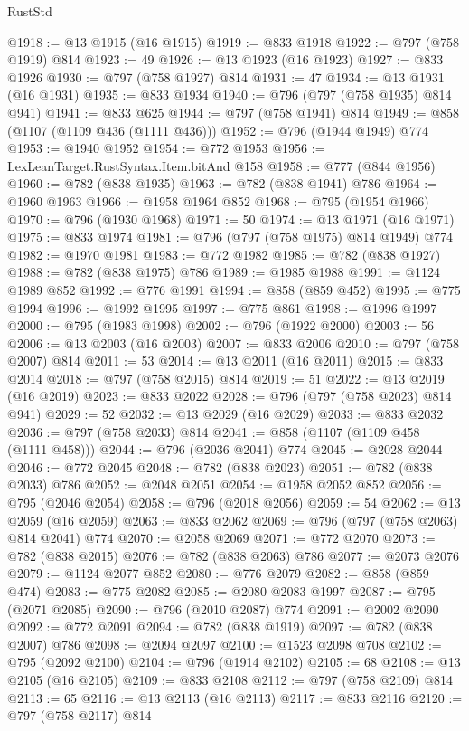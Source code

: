\begin{lexlean}{RustStd}
\begin{coremodule}
@1918 := @13 @1915 (@16 @1915)
@1919 := @833 @1918
@1922 := @797 (@758 @1919) @814
@1923 := 49
@1926 := @13 @1923 (@16 @1923)
@1927 := @833 @1926
@1930 := @797 (@758 @1927) @814
@1931 := 47
@1934 := @13 @1931 (@16 @1931)
@1935 := @833 @1934
@1940 := @796 (@797 (@758 @1935) @814 @941)
@1941 := @833 @625
@1944 := @797 (@758 @1941) @814
@1949 := @858 (@1107 (@1109 @436 (@1111 @436)))
@1952 := @796 (@1944 @1949) @774
@1953 := @1940 @1952
@1954 := @772 @1953
@1956 := LexLeanTarget.RustSyntax.Item.bitAnd @158
@1958 := @777 (@844 @1956)
@1960 := @782 (@838 @1935)
@1963 := @782 (@838 @1941) @786
@1964 := @1960 @1963
@1966 := @1958 @1964 @852
@1968 := @795 (@1954 @1966)
@1970 := @796 (@1930 @1968)
@1971 := 50
@1974 := @13 @1971 (@16 @1971)
@1975 := @833 @1974
@1981 := @796 (@797 (@758 @1975) @814 @1949) @774
@1982 := @1970 @1981
@1983 := @772 @1982
@1985 := @782 (@838 @1927)
@1988 := @782 (@838 @1975) @786
@1989 := @1985 @1988
@1991 := @1124 @1989 @852
@1992 := @776 @1991
@1994 := @858 (@859 @452)
@1995 := @775 @1994
@1996 := @1992 @1995
@1997 := @775 @861
@1998 := @1996 @1997
@2000 := @795 (@1983 @1998)
@2002 := @796 (@1922 @2000)
@2003 := 56
@2006 := @13 @2003 (@16 @2003)
@2007 := @833 @2006
@2010 := @797 (@758 @2007) @814
@2011 := 53
@2014 := @13 @2011 (@16 @2011)
@2015 := @833 @2014
@2018 := @797 (@758 @2015) @814
@2019 := 51
@2022 := @13 @2019 (@16 @2019)
@2023 := @833 @2022
@2028 := @796 (@797 (@758 @2023) @814 @941)
@2029 := 52
@2032 := @13 @2029 (@16 @2029)
@2033 := @833 @2032
@2036 := @797 (@758 @2033) @814
@2041 := @858 (@1107 (@1109 @458 (@1111 @458)))
@2044 := @796 (@2036 @2041) @774
@2045 := @2028 @2044
@2046 := @772 @2045
@2048 := @782 (@838 @2023)
@2051 := @782 (@838 @2033) @786
@2052 := @2048 @2051
@2054 := @1958 @2052 @852
@2056 := @795 (@2046 @2054)
@2058 := @796 (@2018 @2056)
@2059 := 54
@2062 := @13 @2059 (@16 @2059)
@2063 := @833 @2062
@2069 := @796 (@797 (@758 @2063) @814 @2041) @774
@2070 := @2058 @2069
@2071 := @772 @2070
@2073 := @782 (@838 @2015)
@2076 := @782 (@838 @2063) @786
@2077 := @2073 @2076
@2079 := @1124 @2077 @852
@2080 := @776 @2079
@2082 := @858 (@859 @474)
@2083 := @775 @2082
@2085 := @2080 @2083 @1997
@2087 := @795 (@2071 @2085)
@2090 := @796 (@2010 @2087) @774
@2091 := @2002 @2090
@2092 := @772 @2091
@2094 := @782 (@838 @1919)
@2097 := @782 (@838 @2007) @786
@2098 := @2094 @2097
@2100 := @1523 @2098 @708
@2102 := @795 (@2092 @2100)
@2104 := @796 (@1914 @2102)
@2105 := 68
@2108 := @13 @2105 (@16 @2105)
@2109 := @833 @2108
@2112 := @797 (@758 @2109) @814
@2113 := 65
@2116 := @13 @2113 (@16 @2113)
@2117 := @833 @2116
@2120 := @797 (@758 @2117) @814

\end{coremodule}
\end{lexlean}
